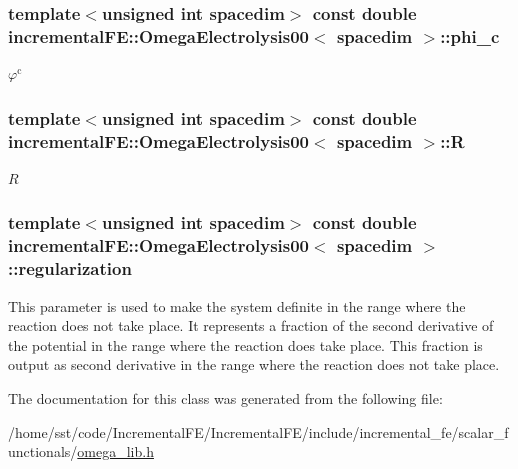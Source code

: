 \subsubsection[{\texorpdfstring{phi\+\_\+c}{phi_c}}]{\setlength{\rightskip}{0pt plus 5cm}template$<$unsigned int spacedim$>$ const double {\bf incremental\+F\+E\+::\+Omega\+Electrolysis00}$<$ spacedim $>$\+::phi\+\_\+c\hspace{0.3cm}{\ttfamily [private]}}\hypertarget{classincremental_f_e_1_1_omega_electrolysis00_ab69759b01a0d2e728c35fb94c9570f6e}{}\label{classincremental_f_e_1_1_omega_electrolysis00_ab69759b01a0d2e728c35fb94c9570f6e}
$\varphi^\mathrm{c}$ 
\subsubsection[{\texorpdfstring{R}{R}}]{\setlength{\rightskip}{0pt plus 5cm}template$<$unsigned int spacedim$>$ const double {\bf incremental\+F\+E\+::\+Omega\+Electrolysis00}$<$ spacedim $>$\+::R\hspace{0.3cm}{\ttfamily [private]}}\hypertarget{classincremental_f_e_1_1_omega_electrolysis00_a1961fc52f44812e204ed81278a1bfa91}{}\label{classincremental_f_e_1_1_omega_electrolysis00_a1961fc52f44812e204ed81278a1bfa91}
$R$ 
\subsubsection[{\texorpdfstring{regularization}{regularization}}]{\setlength{\rightskip}{0pt plus 5cm}template$<$unsigned int spacedim$>$ const double {\bf incremental\+F\+E\+::\+Omega\+Electrolysis00}$<$ spacedim $>$\+::regularization\hspace{0.3cm}{\ttfamily [private]}}\hypertarget{classincremental_f_e_1_1_omega_electrolysis00_a950a1633952a7a5a7cd69f590aa90528}{}\label{classincremental_f_e_1_1_omega_electrolysis00_a950a1633952a7a5a7cd69f590aa90528}
This parameter is used to make the system definite in the range where the reaction does not take place. It represents a fraction of the second derivative of the potential in the range where the reaction does take place. This fraction is output as second derivative in the range where the reaction does not take place. 

The documentation for this class was generated from the following file\+:\begin{DoxyCompactItemize}
\item 
/home/sst/code/\+Incremental\+F\+E/\+Incremental\+F\+E/include/incremental\+\_\+fe/scalar\+\_\+functionals/\hyperlink{omega__lib_8h}{omega\+\_\+lib.\+h}\end{DoxyCompactItemize}
